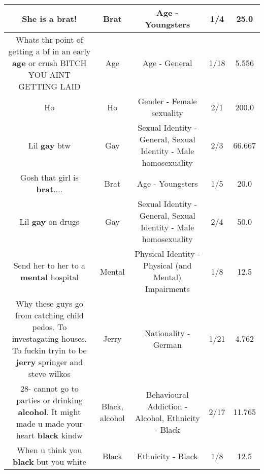 \documentclass[11pt]{article}
\newlength\mylength
\begin{document}
\begin{center}
\begin{longtable}{|C{.65\mylength}|C{.30\mylength}|C{.12\mylength}|C{.12\mylength}|C{.12\mylength}|}
  \small She is a \textbf{brat}!\normalsize   & Brat & Age - Youngsters & 1/4 & 25.0 \\  \hline
  \small Whats thr point of getting a bf in an early \textbf{age} or crush BITCH YOU AINT GETTING LAID\normalsize   & Age & Age - General & 1/18 & 5.556 \\  \hline
  \small Ho\normalsize   & Ho & Gender - Female sexuality & 2/1 & 200.0 \\  \hline
  \small Lil \textbf{g\textbf{ay}} btw\normalsize   & Gay & Sexual Identity - General, Sexual Identity - Male homosexuality & 2/3 & 66.667 \\  \hline
  \small Gosh that girl is \textbf{brat}....\normalsize   & Brat & Age - Youngsters & 1/5 & 20.0 \\  \hline
  \small Lil \textbf{g\textbf{ay}} on drugs\normalsize   & Gay & Sexual Identity - General, Sexual Identity - Male homosexuality & 2/4 & 50.0 \\  \hline
  \small Send her to her to a \textbf{mental} hospital\normalsize   & Mental & Physical Identity - Physical (and Mental) Impairments & 1/8 & 12.5 \\  \hline
  \small Why these guys go from catching child  pedos. To investagating houses. To fuckin tryin to be \textbf{jerry} springer and steve wilkos\normalsize   & Jerry & Nationality - German & 1/21 & 4.762 \\  \hline
  \small 28- cannot go to parties or drinking \textbf{alcohol}. It might made u made your heart \textbf{black} kindw\normalsize   & Black, alcohol & Behavioural Addiction - Alcohol, Ethnicity - Black & 2/17 & 11.765 \\  \hline
  \small When u think you \textbf{black} but you white\normalsize   & Black & Ethnicity - Black & 1/8 & 12.5 \\  \hline

\end{longtable}
\end{center}
\end{document}
